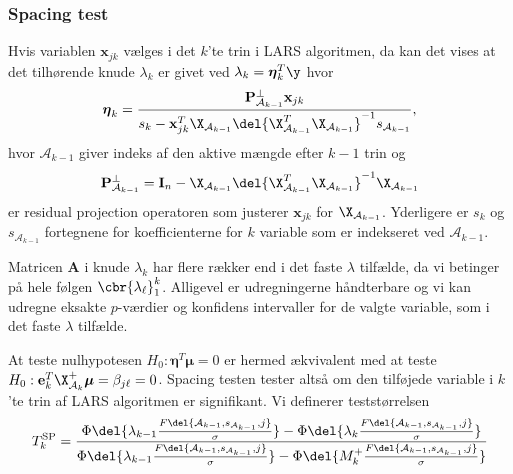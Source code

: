 \subsubsection{Spacing test}
Hvis variablen \(\mathbf{x}_{jk}\) vælges i det \(k\)'te trin i LARS algoritmen, da kan det vises at det tilhørende knude \(\lambda_k\) er givet ved \(\lambda_k = \boldsymbol{\eta}_k^T \y\) hvor
\begin{align*}
\boldsymbol{\eta}_k = \frac{\mathbf{P}^\perp_{\mathcal{A}_{k-1}} \mathbf{x}_{jk}}{s_k - \mathbf{x}_{jk}^T \X_{\mathcal{A}_{k-1}} \del{\X_{\mathcal{A}_{k-1}}^T \X_{\mathcal{A}_{k-1}}}^{-1} s_{\mathcal{A}_{k-1}}},
\end{align*}
hvor \(\mathcal{A}_{k-1}\) giver indeks af den aktive mængde efter \(k-1\) trin og
\begin{align*}
\mathbf{P}^\perp_{\mathcal{A}_{k-1}} = \mathbf{I}_n - \X_{\mathcal{A}_{k-1}} \del{\X_{\mathcal{A}_{k-1}}^T \X_{\mathcal{A}_{k-1}}}^{-1} \X _{\mathcal{A}_{k-1}}
\end{align*}
er residual projection operatoren som justerer \(\mathbf{x}_{jk}\) for \(\X_{\mathcal{A}_{k-1}}\).
Yderligere er \(s_k\) og \(s_{\mathcal{A}_{k-1}}\) fortegnene for koefficienterne for \(k\) variable som er indekseret ved \(\mathcal{A}_{k-1}\).

Matricen \(\mathbf{A}\) i knude \(\lambda_k\) har flere rækker end i det faste \(\lambda\) tilfælde, da vi betinger på hele følgen \(\cbr{\lambda_\ell}_1^k\).
Alligevel er udregningerne håndterbare og vi kan udregne eksakte \(p\)-værdier og konfidens intervaller for de valgte variable, som i det faste \(\lambda\) tilfælde.



At teste nulhypotesen \(H_0: \boldsymbol{\eta}^T \boldsymbol{\mu} =0\) er hermed ækvivalent med at teste \(H_0: \mathbf{e}_k^T \X_{\mathcal{A}_k}^+ \boldsymbol{\mu}=\beta_{j \ell}=0\).
Spacing testen tester altså om den tilføjede variable i \(k\)'te trin af LARS algoritmen er signifikant.
Vi definerer teststørrelsen
\begin{align*}
T_k^{\text{SP}}= \frac{\Phi \del{\lambda_{k-1} \frac{F \del{\mathcal{A}_{k-1}, s_{\mathcal{A}_{k-1}}, j}}{\sigma}} - \Phi \del{\lambda_{k} \frac{F \del{\mathcal{A}_{k-1}, s_{\mathcal{A}_{k-1}}, j}}{\sigma}}}{\Phi \del{\lambda_{k-1} \frac{F \del{\mathcal{A}_{k-1}, s_{\mathcal{A}_{k-1}}, j}}{\sigma}} - \Phi \del{M_{k}^+ \frac{F \del{\mathcal{A}_{k-1}, s_{\mathcal{A}_{k-1}}, j}}{\sigma}}}
\end{align*}


